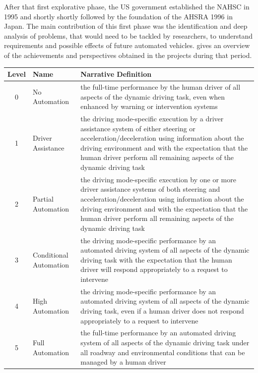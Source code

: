 After that first explorative phase, the US government established the \ac{NAHSC} in 1995 and shortly shortly followed by the foundation of the \ac{AHSRA} 1996 in Japan.
The main contribution of this first phase was the identification and deep analysis of problems, that would need to be tackled by researchers, to understand requirements and possible effects of future automated vehicles.
\cite{Bertozzi2000} gives an overview of the achievements and perspectives obtained in the projects during that period.\\
\begin{center}
	\begin{tabular}{|c | l | p{10cm}|}
		\hline
		\textbf{Level} & \textbf{Name} & \textbf{Narrative Definition}\\ \hline
		0 & No Automation & the full-time performance by the human driver of all aspects of the dynamic driving task, even when enhanced by warning or intervention systems \\ \hline
		1 & Driver Assistance & the driving mode-specific execution by a driver assistance system of either steering or acceleration/deceleration using information about the driving environment and with the expectation that the human driver perform all remaining aspects of the dynamic driving task \\ \hline
		2 & Partial Automation & the driving mode-specific execution by one or more driver assistance systems of both steering and acceleration/deceleration using information	 about the driving environment and with the expectation that the human driver perform all remaining aspects of the dynamic driving task \\ \hline
		3 & Conditional Automation &  the driving mode-specific performance by an automated driving system of all aspects of the dynamic driving task with the expectation that the human driver will respond appropriately to a request to intervene \\ \hline
		4 & High Automation & the driving mode-specific performance by an automated driving system of all aspects of the dynamic driving task, even if a human driver does not respond appropriately to a request to intervene \\ \hline
		5 & Full Automation & the full-time performance by an automated driving system of all aspects of the dynamic driving task under all roadway and environmental conditions that can be managed by a human driver \\ \hline
	\end{tabular}
	\label{tab:autonomy_levels}
\end{center}
